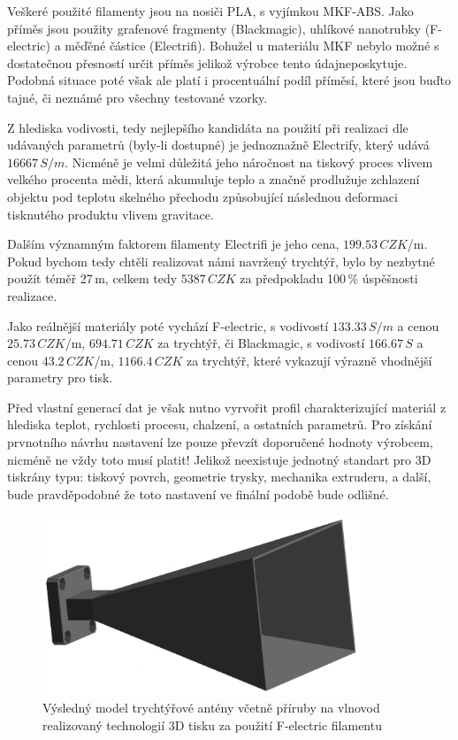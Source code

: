 Veškeré použité filamenty jsou na nosiči PLA, s vyjímkou MKF-ABS. Jako příměs jsou použity grafenové fragmenty (Blackmagic), uhlíkové nanotrubky (F-electric) a měďěné částice (Electrifi). Bohužel u materiálu MKF nebylo možné s dostatečnou přesností určit příměs jelikož výrobce tento údajneposkytuje. Podobná situace poté však ale platí i procentuální podíl příměsí, které jsou buďto tajné, či neznámé pro všechny testované vzorky.

Z hlediska vodivosti, tedy nejlepšího kandidáta na použití při realizaci dle udávaných parametrů (byly-li dostupné) je jednoznažně Electrify, který udává $16667\,S/m$. Nicméně je velmi důležitá jeho náročnost na tiskový proces vlivem velkého procenta mědi, která akumuluje teplo a značně prodlužuje zchlazení objektu pod teplotu skelného přechodu způsobující následnou deformaci tisknutého produktu vlivem gravitace.

Dalším významným faktorem filamenty Electrifi je jeho cena, $199.53\,CZK$/m. Pokud bychom tedy chtěli realizovat námi navržený trychtýř, bylo by nezbytné použít téměř 27\,m, celkem tedy $5 387\,CZK$ za předpokladu 100\,\% úspěšnosti realizace.

Jako reálnější materiály poté vychází F-electric, s vodivostí $133.33\,S/m$ a cenou $25.73\,CZK$/m, $694.71\,CZK$ za trychtýř, či Blackmagic, s vodivostí $166.67\,S$ a cenou $43.2\,CZK$/m, $1 166.4\,CZK$ za trychtýř, které vykazují výrazně vhodnější parametry pro tisk.

Před vlastní generací dat je však nutno vyrvořit profil charakterizující materiál z hlediska teplot, rychlosti procesu, chalzení, a ostatních parametrů. Pro získání prvnotního návrhu nastavení lze pouze převzít doporučené hodnoty výrobcem, nicméně ne vždy toto musí platit! Jelikož neexistuje jednotný standart pro 3D tiskrány typu: tiskový povrch, geometrie trysky, mechanika extruderu, a další, bude pravděpodobné že toto nastavení ve finální podobě bude odlišné.

\begin{figure}[h]
\begin{center}
\includegraphics[width=9.5cm]{pics/HornFinal}
\caption{Výsledný model trychtýřové antény včetně příruby na vlnovod realizovaný technologií 3D tisku za použití F-electric filamentu}
\label{fig:HornRealFe}
\end{center}
\end{figure}

